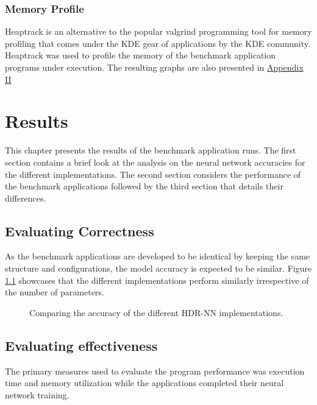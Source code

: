 \subsection{Memory Profile}

Heaptrack is an alternative to the popular valgrind programming tool for memory profiling that comes under the KDE gear of applications by the KDE community. Heaptrack was used to profile the memory of the benchmark application programs under execution. The resulting graphs are also presented in \hyperref[hdrnn-memory-profile]{Appendix II}



\chapter{Results}

This chapter presents the results of the benchmark application runs. The first section contains a brief look at the analysis on the neural network accuracies for the different implementations. The second section considers the performance of the benchmark applications followed by the third section that details their differences.

\section{Evaluating Correctness}

As the benchmark applications are developed to be identical by keeping the same structure and configurations, the model accuracy is expected to be similar. Figure \ref{hdrnn-accuracy} showcases that the different implementations perform similarly irrespective of the number of parameters.

\begin{figure}[!ht]
	\centering
	
	\caption[HDR-NN Accuracy]{Comparing the accuracy of the different HDR-NN implementations.}
	\label{hdrnn-accuracy}
\end{figure}

\section{Evaluating effectiveness}

The primary measures used to evaluate the program performance was execution time and memory utilization while the applications completed their neural network training.


